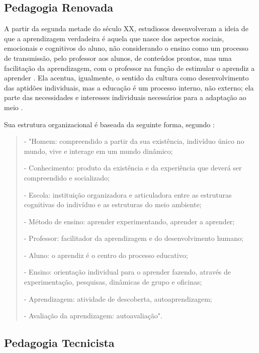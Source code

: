 \subsection{Pedagogia Renovada}\label{sec:ped_renov}

A partir da segunda metade do século XX, estudiosos desenvolveram a ideia de que a aprendizagem verdadeira é aquela que nasce dos aspectos sociais, emocionais e cognitivos do aluno, não considerando o ensino como um processo de transmissão, pelo professor aos alunos, de conteúdos prontos, mas uma facilitação da aprendizagem, com o professor na função de estimular o aprendiz a aprender \cite{larchert}. Ela acentua, igualmente, o sentido da cultura como desenvolvimento das aptidões individuais, mas a educação é um processo interno, não externo; ela parte das necessidades e interesses individuais necessários para a adaptação ao meio \cite{libaneo}.

Sua estrutura organizacional é baseada da seguinte forma, segundo \cite{larchert}:
\begin{quote}- "Homem: compreendido a partir da sua existência, indivíduo único no mundo, vive e interage em um mundo dinâmico;

- Conhecimento: produto da existência e da experiência que deverá ser compreendido e socializado;

- Escola: instituição organizadora e articuladora entre as estruturas cognitivas do indivíduo e as estruturas do meio ambiente;

- Método de ensino: aprender experimentando, aprender a aprender;
	
- Professor: facilitador da aprendizagem e do desenvolvimento humano;

- Aluno: o aprendiz é o centro do processo educativo;

- Ensino: orientação individual para o aprender fazendo, através de experimentação, pesquisas, dinâmicas de grupo e oficinas;
	
- Aprendizagem: atividade de descoberta, autoaprendizagem;

- Avaliação da aprendizagem: autoavaliação".
\end{quote}

\subsection{Pedagogia Tecnicista}\label{sec:ped_tecni}

